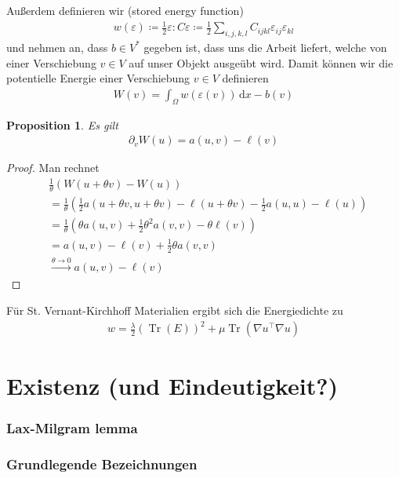 \documentclass{scrartcl}
\newcounter{everything}
\newtheorem{proposition}[everything]{Proposition}
\def\e{\varepsilon}
\newcommand{\dif}[1]{\,\mathrm{d} #1}
\DeclareMathOperator{\Tr}{Tr}       	  %
\begin{document}
Außerdem definieren wir (stored energy function)
\begin{align*}
	w(\e)\coloneqq \frac{1}{2}\e\colon C\e\coloneqq \frac{1}{2}\sum_{i,j,k,l}C_{ijkl}\e_{ij}\e_{kl}
\end{align*}
und nehmen an, dass $b\in V^*$ gegeben ist, dass uns die Arbeit liefert, welche von einer Verschiebung $v\in V$ auf unser Objekt ausgeübt wird. Damit können wir die potentielle Energie einer Verschiebung $v\in V$ definieren
\begin{align*}
	W(v)=\int_\Omega w(\e(v))\dif x- b(v)
\end{align*}


\begin{proposition}
	Es gilt
	\begin{align*}
		\partial_vW(u)=a(u,v)-\ell(v)
	\end{align*}
\end{proposition}
\begin{proof}
	Man rechnet
	\begin{align*}
		&\frac{1}{\theta}\left(W(u+\theta v) -W(u)\right) \\
		&= \frac{1}{\theta}\left(\frac{1}{2}a(u+\theta v,u+\theta v)-\ell(u+\theta v)-\frac{1}{2}a(u,u)-\ell(u)\right) \\
		&= \frac{1}{\theta}\left(\theta a(u,v)+\frac{1}{2}\theta^2a(v,v)-\theta \ell(v)\right) \\
		&= a(u,v)-\ell(v)+\frac{1}{2}\theta a(v,v) \\
		&\xrightarrow{\theta\to0} a(u,v)-\ell(v)
	\end{align*}
\end{proof}

Für St. Vernant-Kirchhoff Materialien ergibt sich die Energiedichte zu
\begin{align*}
	w = \frac{\lambda}{2}(\Tr(E))^2+\mu\Tr(\nabla u^\top\nabla u)
\end{align*}

\section{Existenz (und Eindeutigkeit?)}

\subsubsection*{Lax-Milgram lemma}

\subsubsection*{Grundlegende Bezeichnungen}
\end{document}

